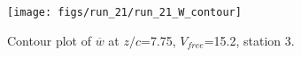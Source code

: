 \begin{figure}[H]
\centering
\texttt{[image: figs/run\_21/run\_21\_W\_contour]}
\caption{Contour plot of $\overline{w}$ at $z/c$=7.75, $V_{free}$=15.2, station 3.}
\label{fig:run_21_W_contour}
\end{figure}


